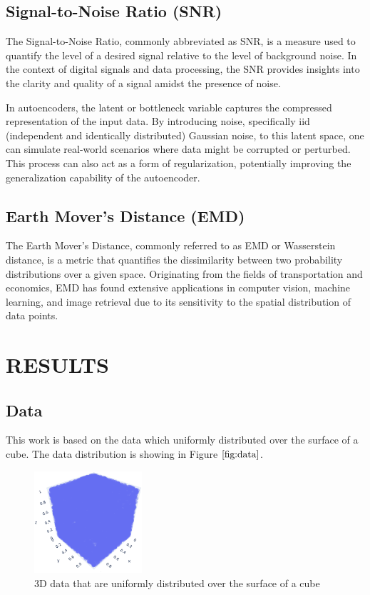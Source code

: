 \documentclass{article}
\begin{document}
\subsection{Signal-to-Noise Ratio (SNR)}
\label{ssec:snr}

The Signal-to-Noise Ratio, commonly abbreviated as SNR, is a measure used to quantify the level of a desired signal relative to the level of background noise. 
In the context of digital signals and data processing, the SNR \cite{vincent2008extracting} provides insights into the clarity and quality of a signal amidst the presence of noise.

In autoencoders, the latent or bottleneck variable captures the compressed representation of the input data. By introducing noise, specifically iid (independent and identically distributed) Gaussian noise, to this latent space, one can simulate real-world scenarios where data might be corrupted or perturbed. This process can also act as a form of regularization, potentially improving the generalization capability of the autoencoder.

\subsection{Earth Mover's Distance (EMD)}
\label{ssec:emd}

The Earth Mover's Distance, commonly referred to as EMD or Wasserstein distance\cite{tolstikhin2017wasserstein}, is a metric that quantifies the dissimilarity between two probability distributions over a given space. Originating from the fields of transportation and economics, EMD has found extensive applications in computer vision, machine learning, and image retrieval due to its sensitivity to the spatial distribution of data points.

\section{RESULTS}
\label{sec:results}

\subsection{Data}
\label{ssec:data}

This work is based on the data which uniformly distributed over the surface of a cube. 
The data distribution is showing in Figure $\ref{fig:data}$.

\begin{figure}[htb]
  \begin{minipage}[b]{1.0\linewidth}
    \centering
    \centerline{\includegraphics[width=4.0cm]{images/data}}
  \end{minipage}
  \caption{3D data that are uniformly distributed over the surface of a cube}
  \label{fig:data}
  \end{figure}
\end{document}
